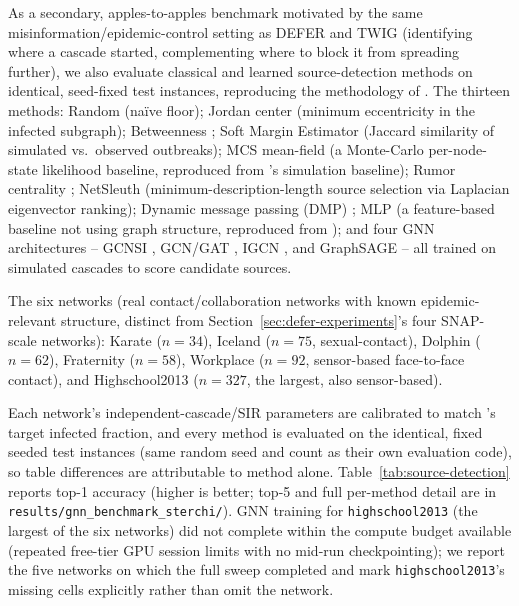 \documentclass[ASNA,number]{USG}
\begin{document}
As a secondary, apples-to-apples benchmark motivated by the same
misinformation/epidemic-control setting as DEFER and TWIG (identifying
where a cascade started, complementing where to block it from spreading
further), we also evaluate classical and learned source-detection methods
on identical, seed-fixed test instances, reproducing the methodology of
\citet{sterchi2026}. The thirteen methods: Random (na\"ive floor); Jordan
center \citep{zhu2016} (minimum eccentricity in the infected subgraph);
Betweenness \citep{freeman1977}; Soft Margin Estimator
\citep{antulov2015} (Jaccard similarity of simulated vs.\ observed
outbreaks); MCS mean-field (a Monte-Carlo per-node-state likelihood
baseline, reproduced from \citet{sterchi2026}'s simulation baseline);
Rumor centrality \citep{shah2011}; NetSleuth \citep{prakash2012}
(minimum-description-length source selection via Laplacian eigenvector
ranking); Dynamic message passing (DMP) \citep{lokhov2014}; MLP (a
feature-based baseline not using graph structure, reproduced from
\citet{sterchi2026}); and four GNN architectures -- GCNSI
\citep{dong2019}, GCN/GAT \citep{shah2020}, IGCN \citep{guo2021}, and
GraphSAGE \citep{haddad2023} -- all trained on simulated cascades to
score candidate sources.

The six networks (real contact/collaboration networks with known
epidemic-relevant structure, distinct from Section~\ref{sec:defer-experiments}'s
four SNAP-scale networks): Karate \citep{zachary1977} ($n=34$), Iceland
\citep{haraldsdottir1992} ($n=75$, sexual-contact), Dolphin
\citep{lusseau2003} ($n=62$), Fraternity \citep{killworth1976} ($n=58$),
Workplace \citep{genois2015} ($n=92$, sensor-based face-to-face contact),
and Highschool2013 \citep{mastrandrea2015} ($n=327$, the largest, also
sensor-based).

Each network's independent-cascade/SIR parameters are calibrated
to match \citet{sterchi2026}'s target infected fraction, and every method
is evaluated on the identical, fixed seeded test instances (same random
seed and count as their own evaluation code), so table differences are
attributable to method alone. Table~\ref{tab:source-detection} reports
top-1 accuracy (higher is better; top-5 and full per-method detail are in
\texttt{results/gnn\_benchmark\_sterchi/}).
GNN training for \texttt{highschool2013} (the largest of the six networks)
did not complete within the compute budget available (repeated free-tier
GPU session limits with no mid-run checkpointing); we report the five
networks on which the full sweep completed and mark
\texttt{highschool2013}'s missing cells explicitly rather than omit the
network.
\end{document}
